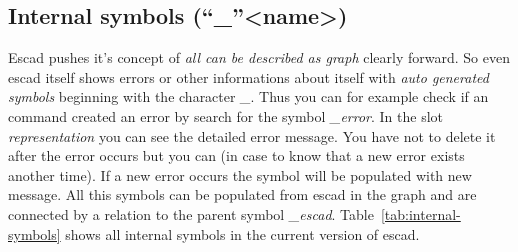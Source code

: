 \documentclass[a4paper, 12pt, openany]{scrbook}
\begin{document}
\subsection{Internal symbols (``\_''<name>)}
Escad pushes it's concept of \emph{all can be described as graph} clearly forward. So even escad itself shows errors or other informations about itself with \emph{auto generated symbols} beginning with the character \emph{\_}. Thus you can for example check if an command created an error by search for the symbol \emph{\_error}. In the slot \emph{representation} you can see the detailed error message. You have not to delete it after the error occurs but you can (in case to know that a new error exists another time). If a new error occurs the symbol will be populated with new message. All this symbols can be populated from escad in the graph and are connected by a relation to the parent symbol \emph{\_escad}.
Table~\ref{tab:internal-symbols} shows all internal symbols in the current version of escad.
\end{document}
